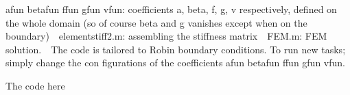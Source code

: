  afun betafun ffun gfun vfun: coefficients a, beta, f, g, v respectively, defined on the whole domain (so of course beta and g vanishes except when on the boundary)\
\
elementstiff2.m: assembling the stiffness matrix\
\
FEM.m: FEM solution.\
\
The code is tailored to Robin boundary conditions. To run new tasks; simply change the con figurations of the coefficients afun betafun ffun gfun vfun.\

The code here 
